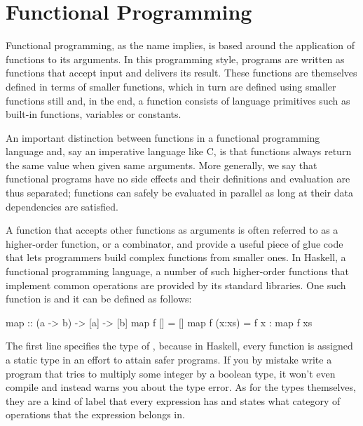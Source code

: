 \documentclass[../main.tex]{subfiles}
\begin{document}

\section{Functional Programming}
\label{functional}

Functional programming, as the name implies, is based around the application of functions to its arguments. In this programming style, programs are written as functions that accept input and delivers its result. These functions are themselves defined in terms of smaller functions, which in turn are defined using smaller functions still and, in the end, a function consists of language primitives such as built-in functions, variables or constants.

An important distinction between functions in a functional programming language and, say an imperative language like C, is that functions always return the same value when given same arguments. More generally, we say that functional programs have no side effects and their definitions and evaluation are thus separated; functions can safely be evaluated in parallel as long at their data dependencies are satisfied.

A function that accepts other functions as arguments is often referred to as a higher-order function, or a combinator, and provide a useful piece of glue code that lets programmers build complex functions from smaller ones. In Haskell, a functional programming language, a number of such higher-order functions that implement common operations are provided by its standard libraries. One such function is  and it can be defined as follows:

\begin{code}
map :: (a -> b) -> [a] -> [b]
map f []     = []
map f (x:xs) = f x : map f xs
\end{code}

The first line specifies the type of , because in Haskell, every function is assigned a static type in an effort to attain safer programs. If you by mistake write a program that tries to multiply some integer by a boolean type, it won't even compile and instead warns you about the type error. As for the types themselves, they are a kind of label that every expression has and states what category of operations that the expression belongs in.
\end{document}
